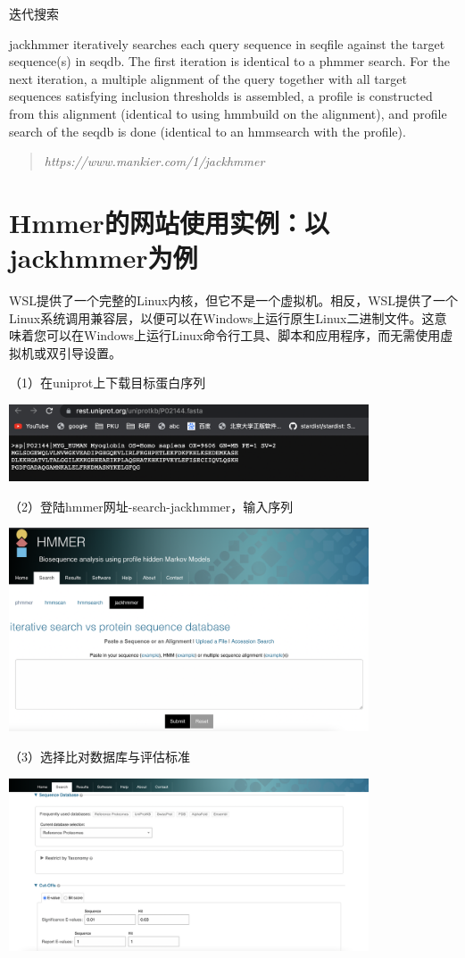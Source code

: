 迭代搜索

jackhmmer iteratively searches each query sequence in seqfile against the target sequence(s) in seqdb. The first iteration is identical to a phmmer search. For the next iteration, a multiple alignment of the query together with all target sequences satisfying  inclusion thresholds is assembled, a profile is constructed from this alignment (identical to using hmmbuild on the alignment), and profile search of the seqdb is done (identical to an hmmsearch with the profile).

\begin{quotation}
    \textit{https://www.mankier.com/1/jackhmmer}
\end{quotation}

\section{Hmmer的网站使用实例：以jackhmmer为例}

WSL提供了一个完整的Linux内核，但它不是一个虚拟机。相反，WSL提供了一个Linux系统调用兼容层，以便可以在Windows上运行原生Linux二进制文件。这意味着您可以在Windows上运行Linux命令行工具、脚本和应用程序，而无需使用虚拟机或双引导设置。


（1）在uniprot上下载目标蛋白序列

\includegraphics[width=0.8\textwidth]{./image/gdk/7.4.1.png}

（2）登陆hmmer网址-search-jackhmmer，输入序列

\includegraphics[width=0.8\textwidth]{./image/gdk/7.4.2.png}

（3）选择比对数据库与评估标准

\includegraphics[width=0.8\textwidth]{./image/gdk/7.4.3.png}

